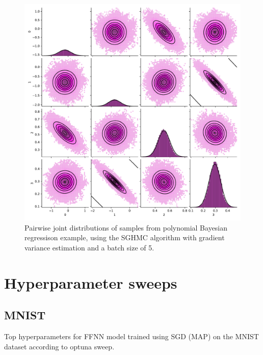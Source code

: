 \begin{figure}[htbp]
    \centering
    \includegraphics[width=\linewidth]{Figures/simulated_pairs_SGHMCWithVarianceEstimator_5.pdf}
    \caption{Pairwise joint distributions of samples from polynomial Bayesian regressison example, using the SGHMC algorithm with gradient variance estimation  and a batch size of 5.}
    \label{fig:pairs-sghmc-var-est-5}
\end{figure}

\FloatBarrier
\chapter{Hyperparameter sweeps} 

\section{MNIST} \label{apx:mnist-sweep}



\begin{table}[H]
    \centering
    \resizebox{
        \ifdim\width>\columnwidth
        \columnwidth
      \else
        \width
      \fi
    }{!}{\small
    
    }
    \caption{Top hyperparameters for FFNN model trained using SGD (MAP) on the MNIST dataset according to optuna sweep.}
    \label{tab:mnist-sgd-map-hparams}
\end{table}

